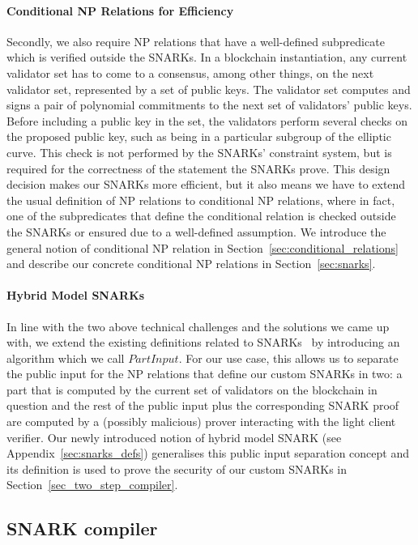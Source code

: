 \paragraph{Conditional NP Relations for Efficiency} Secondly, we also require NP relations that have a well-defined subpredicate which is verified outside the SNARKs. In a blockchain instantiation, 
any current validator set has to come to a consensus, among other things, on the next validator set, represented by a set of public keys. The validator set 
computes and signs a pair of polynomial commitments to the next set of validators' public keys. Before including a public key in the set, the validators perform several 
checks on the proposed public key, such as being in a particular subgroup of the elliptic curve. This check is not performed by the SNARKs' constraint system, but is 
required for the correctness of the statement the SNARKs prove. This design decision makes our SNARKs more efficient, but it also means we have to extend the 
usual definition of NP relations to conditional NP relations, where in fact, one of the subpredicates that define the conditional relation is checked outside the SNARKs 
or ensured due to a well-defined assumption. We introduce the general notion of conditional NP relation in Section~\ref{sec:conditional_relations} and describe our 
concrete conditional NP relations in Section~\ref{sec:snarks}.   

\paragraph{Hybrid Model SNARKs} In line with the two above technical challenges and the solutions we came up with, we extend the existing definitions 
related to SNARKs~\cite{groth16,plonk} by introducing an algorithm which we call $\mathit{PartInput}$. For our use case, this allows us to separate the public input for the NP relations that define our custom SNARKs in two: a part 
that is computed by the current set of validators on the blockchain in question and the rest of the public input plus the corresponding SNARK proof are 
computed by a (possibly malicious) prover interacting with the light client verifier. Our newly introduced notion of hybrid model SNARK (see Appendix~\ref{sec:snarks_defs}) 
generalises this public input separation concept and its definition is used to prove the security of our custom SNARKs in Section~\ref{sec_two_step_compiler}.

\subsection{SNARK compiler}

